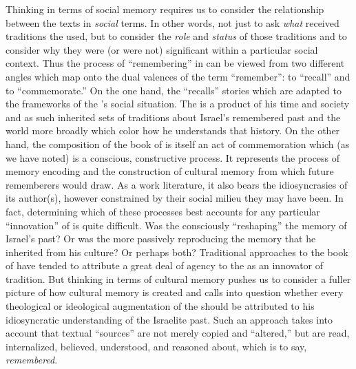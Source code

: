Thinking in terms of social memory requires us to consider the relationship between the texts in \emph{social} terms. In other words, not just to ask \emph{what} received traditions the \chronicler used, but to consider the \emph{role} and \emph{status} of those traditions and to consider why they were (or were not) significant within a particular social context. Thus the process of ``remembering'' in \chronicles can be viewed from two different angles which map onto the dual valences of the term ``remember'': to ``recall'' and to ``commemorate.'' On the one hand, the \chronicler ``recalls'' stories which are adapted to the frameworks of the \chronicler's social situation. The \chronicler is a product of his time and society and as such inherited sets of traditions about Israel's remembered past and the world more broadly which color how he understands that history. On the other hand, the composition of the book of \chronicles is itself an act of commemoration which (as we have noted) is a conscious, constructive process. It represents the process of memory encoding and the construction of cultural memory from which future rememberers would draw. As a work literature, it also bears the idiosyncrasies of its author(s), however constrained by their social milieu they may have been. In fact, determining which of these processes best accounts for any particular ``innovation'' of \chronicles is quite difficult. Was the \chronicler consciously ``reshaping'' the memory of Israel's past? Or was the \chronicler more passively reproducing the memory that he inherited from his culture? Or perhaps both? Traditional approaches to the book of \chronicles have tended to attribute a great deal of agency to the \chronicler as an innovator of tradition. But thinking in terms of cultural memory pushes us to consider a fuller picture of how cultural memory is created and calls into question whether every theological or ideological augmentation of the \chronicler should be attributed to his idiosyncratic understanding of the Israelite past. Such an approach takes into account that textual ``sources'' are not merely copied and ``altered,'' but are read, internalized, believed, understood, and reasoned about, which is to say, \emph{remembered}.

